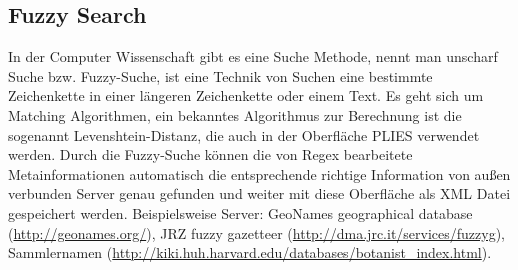 \documentclass[10pt,a4paper]{report}
\begin{document}
\subsection{Fuzzy Search}
In der Computer Wissenschaft gibt es eine Suche Methode, nennt man unscharf Suche bzw. Fuzzy-Suche, ist eine Technik von Suchen eine bestimmte Zeichenkette in einer längeren Zeichenkette oder einem Text. Es geht sich um Matching Algorithmen, ein bekanntes Algorithmus zur Berechnung ist die sogenannt Levenshtein-Distanz, die auch in der Oberfläche PLIES verwendet werden.  
Durch die Fuzzy-Suche können die von Regex bearbeitete Metainformationen  automatisch die entsprechende richtige Information von außen verbunden Server genau gefunden und weiter mit diese Oberfläche als XML Datei gespeichert werden. Beispielsweise Server: GeoNames geographical database (\href{http://geonames.org/}{http://geonames.org/}), JRZ fuzzy gazetteer (\href{http://dma.jrc.it/services/fuzzyg}{http://dma.jrc.it/services/fuzzyg}), Sammlernamen (\href{http://kiki.huh.harvard.edu/databases/botanist\_index.html}{http://kiki.huh.harvard.edu/databases/botanist\_index.html}).
\end{document}
